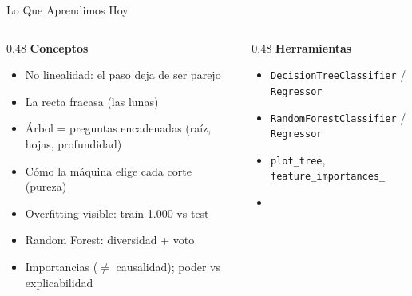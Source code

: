 \documentclass[aspectratio=169, 11pt]{beamer}
\begin{document}
\begin{frame}[shrink=8]{Lo Que Aprendimos Hoy}
  \vspace{-4pt}
  \begin{columns}[T]
    \begin{column}{0.48\textwidth}
      {\footnotesize\color{arcaDark}\bfseries Conceptos}
      \vspace{3pt}
      {\footnotesize\color{textMuted}
      \begin{itemize}\setlength{\itemsep}{2pt}
        \item[{\color{codeGreen}\scriptsize\faCheck}]
          No linealidad: el paso deja de ser parejo
        \item[{\color{codeGreen}\scriptsize\faCheck}]
          La recta fracasa (las lunas)
        \item[{\color{codeGreen}\scriptsize\faCheck}]
          Árbol = preguntas encadenadas (raíz, hojas,
          profundidad)
        \item[{\color{codeGreen}\scriptsize\faCheck}]
          Cómo la máquina elige cada corte (pureza)
        \item[{\color{codeGreen}\scriptsize\faCheck}]
          Overfitting visible: train 1.000 vs test
        \item[{\color{codeGreen}\scriptsize\faCheck}]
          Random Forest: diversidad + voto
        \item[{\color{codeGreen}\scriptsize\faCheck}]
          Importancias (\(\neq\) causalidad); poder vs
          explicabilidad
      \end{itemize}
      }
    \end{column}
    \begin{column}{0.48\textwidth}
      {\footnotesize\color{arcaDark}\bfseries Herramientas}
      \vspace{3pt}
      {\footnotesize\color{textMuted}
      \begin{itemize}\setlength{\itemsep}{2pt}
        \item[{\color{arcaRed}\scriptsize\faTools}]
          \texttt{DecisionTreeClassifier} / \texttt{Regressor}
        \item[{\color{arcaRed}\scriptsize\faTools}]
          \texttt{RandomForestClassifier} / \texttt{Regressor}
        \item[{\color{arcaRed}\scriptsize\faTools}]
          \texttt{plot\_tree}, \texttt{feature\_importances\_}
        \item[{\color{arcaRed}\scriptsize\faTools}]

\end{itemize}}
\end{column}
\end{columns}
\end{frame}
\end{document}
